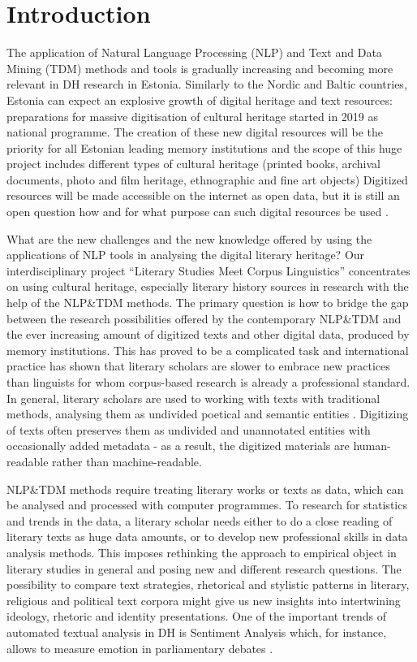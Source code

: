 \documentclass[runningheads]{llncs}
\begin{document}
\section{Introduction}

The application of Natural Language Processing (NLP) and Text and Data Mining (TDM) methods and tools is gradually increasing and becoming more relevant in DH research in Estonia. Similarly to the Nordic and Baltic countries, Estonia can expect an explosive growth of digital heritage and text resources: preparations for massive digitisation of cultural heritage started in 2019 as national programme. The creation of these new digital resources will be the priority for all Estonian leading memory institutions and the scope of this huge project includes different types of cultural heritage (printed books, archival documents, photo and film heritage, ethnographic and fine art objects) \cite{digiteerimine,viireslaak18} Digitized resources will be made accessible on the internet as open data, but it is still an open question how and for what purpose can such digital resources be used \cite{laakviires}. 

What are the new challenges and the new knowledge offered by using the applications of NLP tools in analysing the digital literary heritage? Our interdisciplinary project ``Literary Studies Meet Corpus Linguistics'' concentrates on using cultural heritage, especially literary history sources in research with the help of the NLP\&TDM methods. The primary question is how to bridge the gap between the research possibilities offered by the contemporary NLP\&TDM and the ever increasing amount of digitized texts and other digital data, produced by memory institutions. This has proved to be a complicated task and international practice has shown that literary scholars are slower to embrace new practices than linguists for whom corpus-based research is already a professional standard. In general, literary scholars are used to working with texts with traditional methods, analysing them as undivided poetical and semantic entities \cite{viireslaak18}. Digitizing of texts often preserves them as undivided and unannotated entities with occasionally added metadata - as a result, the digitized materials are human-readable rather than machine-readable.

NLP\&TDM methods require treating literary works or texts as data, which can be analysed and processed with computer programmes. To research for statistics and trends in the data, a literary scholar needs either to do a close reading of literary texts as huge data amounts, or to develop new professional skills in data analysis methods. This imposes rethinking the approach to empirical object in literary studies in general and posing new and different research questions. The possibility to compare text strategies, rhetorical and stylistic patterns in literary, religious and political text corpora might give us new insights into intertwining ideology, rhetoric and identity presentations. One of the important trends of automated textual analysis in DH is Sentiment Analysis which, for instance, allows to measure emotion in parliamentary debates \cite{Rheault2016}.
\end{document}
